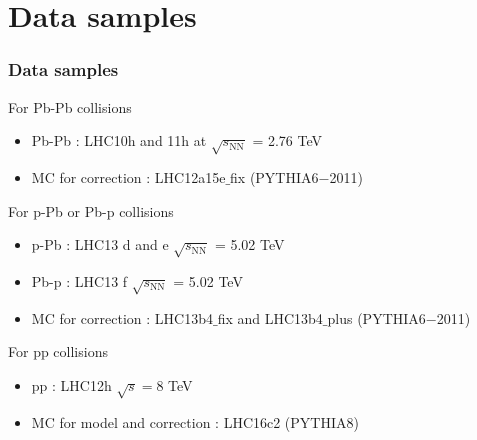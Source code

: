 \section{Data samples}
\begin{frame}
\frametitle{Data samples}
For Pb-Pb collisions
\begin{itemize}
		\item{Pb-Pb : LHC10h and 11h at $\sqrt{s_\mathrm{NN}}$ = 2.76 TeV}
		\item{MC for correction : LHC12a15e$\_$fix (PYTHIA6$-$2011)}
\end{itemize}


For p-Pb or Pb-p collisions
	\begin{itemize}
		\item{p-Pb : LHC13 d and e $\sqrt{s_\mathrm{NN}}$ = 5.02 TeV}
		\item{Pb-p : LHC13 f $\sqrt{s_\mathrm{NN}}$ = 5.02 TeV }
		\item{MC for correction : LHC13b4$\_$fix and LHC13b4$\_$plus (PYTHIA6$-$2011)}
	\end{itemize}
	
For pp collisions
	\begin{itemize}
	         \item{pp : LHC12h  $\sqrt{s}=8$ TeV}
	         \item{MC for model and correction : LHC16c2 (PYTHIA8)}
	\end{itemize}

\end{frame}

